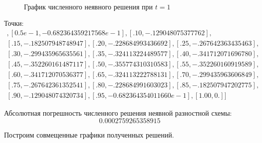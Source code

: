 \documentclass[14pt,a4paper]{scrartcl}
\begin{document}
\pagebreak

\begin{figure}[H]
	\begin{minipage}[h]{1\linewidth}
		\\
		\caption{График численного неявного решения при $t=1$}
	\end{minipage}
\end{figure}

Точки:
\begin{align*}
[[0., 0.], [0.5e-1, -0.682364359217568e-1], [.10, -.129048075377762],\\
 [.15, -.182507948748947], [.20, -.228684993436692], [.25, -.267642363435463],\\
  [.30, -.299435965635561], [.35, -.324113224489577], [.40, -.341712071696780],\\
   [.45, -.352260161487117], [.50, -.355774310310583], [.55, -.352260160919589], \\
   [.60, -.341712070536377], [.65, -.324113222788131], [.70, -.299435963606849],\\
    [.75, -.267642361352541], [.80, -.228684991603023], [.85, -.182507947202775],\\ 
    [.90, -.129048074320734], [.95, -0.682364354011660e-1], [1.00, 0.]]
\end{align*}



Абсолютная погрешность численного решения неявной разностной схемы: $$0.0002759265358915$$



\pagebreak

Построим совмещенные графики полученных решений.
\end{document}
